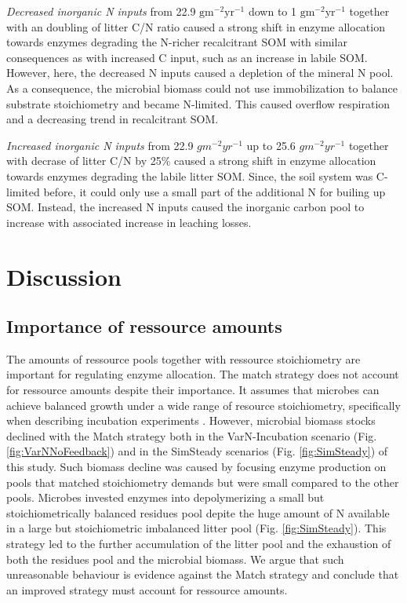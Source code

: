 \textit{Decreased inorganic N inputs} from 22.9
${\textrm{gm}^{-2}\textrm{yr}^{-1}}$ down to 1
${\textrm{gm}^{-2}\textrm{yr}^{-1}}$ together with an doubling of litter C/N
ratio caused a strong shift in enzyme allocation towards enzymes degrading the
N-richer recalcitrant SOM with similar consequences as with increased C input,
such as an increase in labile SOM. However, here, the decreased N inputs caused
a depletion of the mineral N pool.
As a consequence, the microbial biomass could not use immobilization to
balance substrate stoichiometry and became N-limited.
This caused overflow respiration and a decreasing trend in recalcitrant SOM.

\textit{Increased inorganic N inputs} from 22.9 $gm^{-2}yr^{-1}$ up to 25.6
$gm^{-2}yr^{-1}$ together with decrase of litter C/N by 25\% caused a strong
shift in enzyme allocation towards enzymes degrading the labile litter SOM.
Since, the soil system was C-limited before, it could only use a small part of
the additional N for builing up SOM.
Instead, the increased N inputs caused the inorganic carbon pool to increase
with associated increase in leaching losses.

\section{Discussion}
\subsection{Importance of ressource amounts}
The amounts of ressource pools together with ressource stoichiometry are
important for regulating enzyme allocation. The match strategy does not account
for ressource amounts despite their importance. It assumes that microbes can
achieve balanced growth under a wide range of resource stoichiometry,
specifically when describing incubation experiments \citep{Moorhead12,
Ballentine14}. However, microbial biomass stocks declined with the Match
strategy both in the VarN-Incubation scenario (Fig. \ref{fig:VarNNoFeedback})
and in the SimSteady scenarios (Fig. \ref{fig:SimSteady}) of this study. Such
biomass decline was caused by focusing enzyme production on pools that matched
stoichiometry demands but were small compared to the other pools. Microbes
invested enzymes into depolymerizing a small but stoichiometrically balanced
residues pool depite the huge amount of N available in a large but
stoichiometric imbalanced litter pool (Fig.
\ref{fig:SimSteady}). This strategy led to the further accumulation of the
litter pool and the exhaustion of both the residues pool and the microbial
biomass. We argue that such unreasonable behaviour is evidence against the Match
strategy and conclude that an improved strategy must account for ressource
amounts.

